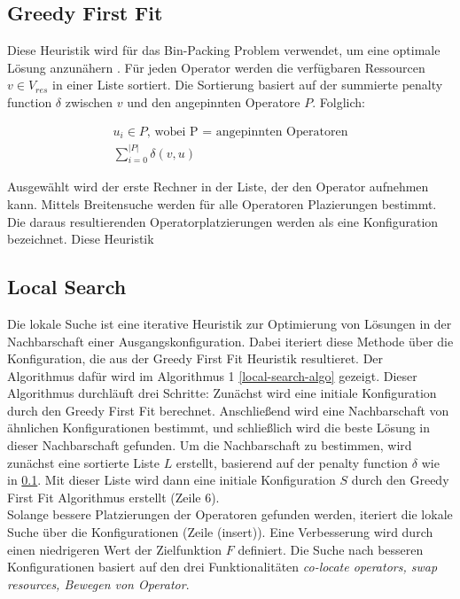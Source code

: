 \documentclass{article}
\begin{document}
\subsection{Greedy First Fit} \label{greedy-first-fit}
Diese Heuristik wird  für das Bin-Packing Problem verwendet, um eine optimale Lösung anzunähern \cite{greedy-first-fit}. 
Für jeden Operator werden die verfügbaren Ressourcen $v \in V_{res}$ in einer Liste sortiert. Die Sortierung basiert auf der summierte penalty function $\delta$
zwischen $v$ und den angepinnten Operatore $P$. Folglich:

\[ 
    \begin{gathered}
        u_i \in P \text{, wobei P = angepinnten Operatoren} \\
        \sum_{i=0}^{|P|} \delta(v, u)
    \end{gathered} 
\] 

Ausgewählt wird der erste Rechner in der Liste, der den Operator aufnehmen kann. 
Mittels Breitensuche werden für alle Operatoren Plazierungen bestimmt. Die daraus resultierenden Operatorplatzierungen werden als eine Konfiguration bezeichnet. 
Diese Heuristik 




\subsection{Local Search} \label{local-search}
Die lokale Suche ist eine iterative Heuristik zur Optimierung von Lösungen in der Nachbarschaft einer Ausgangskonfiguration.
Dabei iteriert diese Methode über die Konfiguration, die aus der Greedy First Fit Heuristik resultieret. Der Algorithmus dafür wird im Algorithmus 1 \ref{local-search-algo} gezeigt. 
Dieser Algorithmus durchläuft drei Schritte: Zunächst wird eine initiale Konfiguration durch den Greedy First Fit berechnet.
 Anschließend wird eine Nachbarschaft von ähnlichen Konfigurationen bestimmt, und schließlich wird die beste Lösung in dieser Nachbarschaft gefunden. 
 Um die Nachbarschaft zu bestimmen, wird zunächst eine sortierte Liste $L$ erstellt, basierend auf der penalty function $\delta$ wie in \ref{greedy-first-fit}.
Mit dieser Liste wird dann eine initiale Konfiguration $S$ durch den Greedy First Fit Algorithmus erstellt (Zeile 6). \\



Solange bessere Platzierungen der Operatoren gefunden werden, iteriert die lokale Suche über die Konfigurationen  (Zeile (insert)). 
Eine Verbesserung wird durch einen niedrigeren Wert der Zielfunktion $F$ definiert. 
Die Suche nach besseren Konfigurationen basiert auf den drei Funktionalitäten \textit{co-locate operators, swap resources, Bewegen von Operator}. \\
\end{document}
